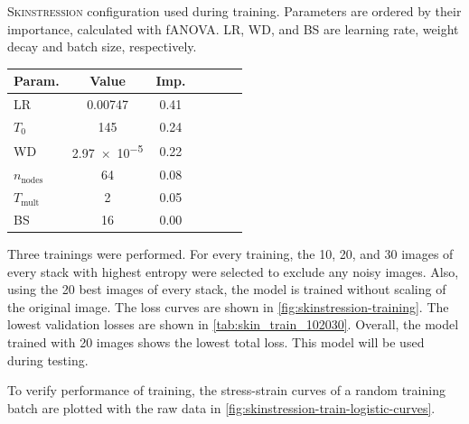 \begin{margintable}
    \centering
    \caption[\textsc{Skinstression} configuration]{
        \textsc{Skinstression} configuration used during training.
        Parameters are ordered by their importance, calculated with fANOVA.
        LR, WD, and BS are learning rate, weight decay and batch size, respectively.
    }
    \label{tab:conf_skin_final}
    \begin{tabular}{l c c c c c c}
        \toprule
        Param.               & Value         & Imp. \\
        \midrule
        {LR}                 & 0.00747       & 0.41 \\
        {$T_0$}              & 145           & 0.24 \\
        {WD}                 & \num{2.97e-5} & 0.22 \\
        {$n_\mathrm{nodes}$} & 64            & 0.08 \\
        {$T_\mathrm{mult}$}  & 2             & 0.05 \\
        {BS}                 & 16            & 0.00 \\
        \bottomrule
    \end{tabular}
\end{margintable}

Three trainings were performed.
For every training, the 10, 20, and 30 images of every stack with highest entropy were selected to exclude any noisy images.
Also, using the 20 best images of every stack, the model is trained without scaling of the original image.
The loss curves are shown in \cref{fig:skinstression-training}.
The lowest validation losses are shown in \cref{tab:skin_train_102030}.
Overall, the model trained with 20 images shows the lowest total loss.
This model will be used during testing.

To verify performance of training, the stress-strain curves of a random training batch are plotted with the raw data in \cref{fig:skinstression-train-logistic-curves}.


